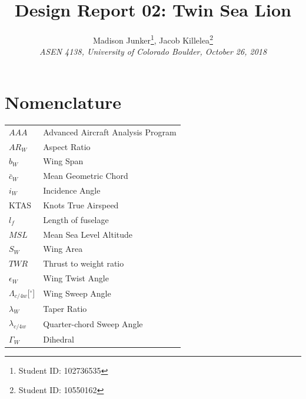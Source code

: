 \documentclass[conf]{new-aiaa}
\title{Design Report 02: Twin Sea Lion}
\author{
    Madison Junker\footnote{Student ID: 102736535 }, Jacob Killelea\footnote{Student ID: 10550162 } \\
    \emph{ASEN 4138, University of Colorado Boulder, October 26, 2018}
}
\begin{document}
\clearpage
\maketitle
\thispagestyle{empty}

\newpage
{}
\tableofcontents
{}
\listoffigures
{}
\listoftables
\newpage
\printnomenclature[25mm]

\section*{Nomenclature}

{\renewcommand\arraystretch{1.0}
\noindent\begin{longtable*}{@{}l @{\quad=\quad} l@{}}
$AAA$     	               & Advanced Aircraft Analysis Program \\
$AR_W$    	               & Aspect Ratio                       \\
$b_W$	  	               & Wing Span                          \\
$\bar{c}_W$	  	           & Mean Geometric Chord               \\
$i_W$		               & Incidence Angle                    \\
KTAS                       & Knots True Airspeed                \\
$l_f$     	               & Length of fuselage                 \\
$MSL$     	               & Mean Sea Level Altitude            \\
$S_W$     	               & Wing Area                          \\
$TWR$     	               & Thrust to weight ratio             \\
$\epsilon_W$               & Wing Twist Angle                   \\
$\Lambda_{c/4w}$[$^\circ$] & Wing Sweep Angle                   \\
$\lambda_W$	               & Taper Ratio                        \\
$\lambda_{c/4w}$           & Quarter-chord Sweep Angle          \\
$\Gamma_W$	               & Dihedral                           \\
\end{longtable*}}

\newpage
{}
\end{document}
